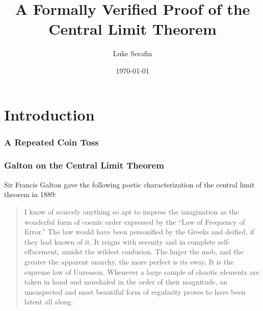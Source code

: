 \documentclass{beamer}
\title{A Formally Verified Proof of the \protect\\ Central Limit Theorem}
\author{Luke Serafin}
\institute{Carnegie Mellon University}
\date{\today}
\begin{document}
\begin{frame}
\titlepage
\end{frame}

\begin{frame}
\tableofcontents
\end{frame}

\section{Introduction}

\begin{frame}
\frametitle{A Repeated Coin Toss}
\begin{center}
\end{center}

\begin{center}
   
\end{center}
\end{frame}

\begin{frame}
\frametitle{Galton on the Central Limit Theorem}
Sir Francis Galton gave the following poetic characterization of the central limit theorem in 1889: \pause

\begin{quote}
 I know of scarcely anything so apt to impress the imagination as the wonderful form of cosmic order expressed by the ``Law of Frequency of Error.'' The law would have been personified by the Greeks and deified, if they had known of it. It reigns with serenity and in complete self-effacement, amidst the wildest confusion. The huger the mob, and the greater the apparent anarchy, the more perfect is its sway. It is the supreme law of Unreason. Whenever a large sample of chaotic elements are taken in hand and marshaled in the order of their magnitude, an unsuspected and most beautiful form of regularity proves to have been latent all along.
\end{quote}
\end{frame}
\end{document}

